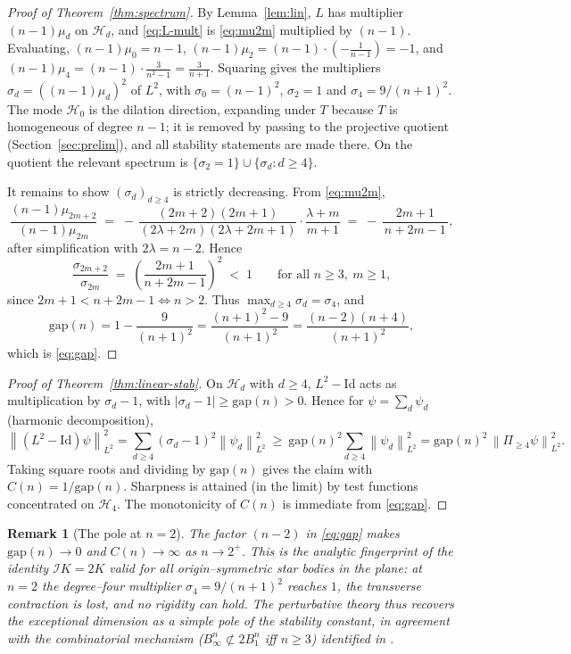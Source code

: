\documentclass[10pt,a4paper]{amsart}
\newtheorem{remark}[theorem]{Remark}
\newcommand{\IB}{\mathcal{I}}
\newcommand{\Hd}[1]{\mathcal{H}_{#1}}
\newcommand{\norm}[1]{\left\lVert #1 \right\rVert}
\newcommand{\abs}[1]{\left\lvert #1 \right\rvert}
\begin{document}
\begin{proof}[Proof of Theorem~\ref{thm:spectrum}]
By Lemma~\ref{lem:lin}, $L$ has multiplier $(n-1)\mu_d$ on $\Hd d$, and
\eqref{eq:L-mult} is \eqref{eq:mu2m} multiplied by $(n-1)$. Evaluating,
$(n-1)\mu_0=n-1$, $(n-1)\mu_2=(n-1)\cdot(-\tfrac1{n-1})=-1$, and
$(n-1)\mu_4=(n-1)\cdot\tfrac{3}{n^2-1}=\tfrac{3}{n+1}$. Squaring gives the
multipliers $\sigma_d=((n-1)\mu_d)^2$ of $L^2$, with $\sigma_0=(n-1)^2$,
$\sigma_2=1$ and $\sigma_4=9/(n+1)^2$. The mode $\Hd0$ is the dilation
direction, expanding under $T$ because $T$ is homogeneous of degree $n-1$; it is
removed by passing to the projective quotient (Section~\ref{sec:prelim}), and
all stability statements are made there. On the quotient the relevant spectrum
is $\{\sigma_2=1\}\cup\{\sigma_d:d\ge4\}$.

It remains to show $(\sigma_d)_{d\ge4}$ is strictly decreasing. From
\eqref{eq:mu2m},
\[
   \frac{(n-1)\mu_{2m+2}}{(n-1)\mu_{2m}}
   \;=\;-\,\frac{(2m+2)(2m+1)}{(2\lambda+2m)(2\lambda+2m+1)}\cdot
        \frac{\lambda+m}{m+1}
   \;=\;-\,\frac{2m+1}{\,n+2m-1\,},
\]
after simplification with $2\lambda=n-2$. Hence
\[
   \frac{\sigma_{2m+2}}{\sigma_{2m}}\;=\;\left(\frac{2m+1}{n+2m-1}\right)^{2}
   \;<\;1\qquad\text{for all } n\ge 3,\ m\ge 1,
\]
since $2m+1<n+2m-1\Leftrightarrow n>2$. Thus $\max_{d\ge4}\sigma_d=\sigma_4$,
and
\[
   \mathrm{gap}(n)=1-\frac{9}{(n+1)^2}=\frac{(n+1)^2-9}{(n+1)^2}
   =\frac{(n-2)(n+4)}{(n+1)^2},
\]
which is \eqref{eq:gap}.
\end{proof}


\begin{proof}[Proof of Theorem~\ref{thm:linear-stab}]
On $\Hd d$ with $d\ge4$, $L^2-\mathrm{Id}$ acts as multiplication by
$\sigma_d-1$, with $\abs{\sigma_d-1}\ge \mathrm{gap}(n)>0$. Hence for
$\psi=\sum_{d}\psi_d$ (harmonic decomposition),
\[
   \norm{(L^2-\mathrm{Id})\psi}_{L^2}^2
   =\sum_{d\ge4}(\sigma_d-1)^2\norm{\psi_d}_{L^2}^2
   \ \ge\ \mathrm{gap}(n)^2\sum_{d\ge4}\norm{\psi_d}_{L^2}^2
   =\mathrm{gap}(n)^2\,\norm{\Pi_{\ge4}\psi}_{L^2}^2 .
\]
Taking square roots and dividing by $\mathrm{gap}(n)$ gives the claim with
$C(n)=1/\mathrm{gap}(n)$. Sharpness is attained (in the limit) by test
functions concentrated on $\Hd 4$. The monotonicity of $C(n)$ is immediate
from \eqref{eq:gap}.
\end{proof}

\begin{remark}[The pole at $n=2$]
The factor $(n-2)$ in \eqref{eq:gap} makes $\mathrm{gap}(n)\to0$ and
$C(n)\to\infty$ as $n\to2^+$. This is the analytic fingerprint of the identity
$\IB K=2K$ valid for all origin--symmetric star bodies in the plane: at $n=2$
the degree--four multiplier $\sigma_4=9/(n+1)^2$ reaches $1$, the transverse
contraction is lost, and no rigidity can hold. The perturbative theory thus
recovers the exceptional dimension as a simple pole of the stability constant,
in agreement with the combinatorial mechanism ($B_\infty^n\not\subset 2B_1^n$
iff $n\ge3$) identified in \cite{MSY2025}.
\end{remark}
\end{document}
